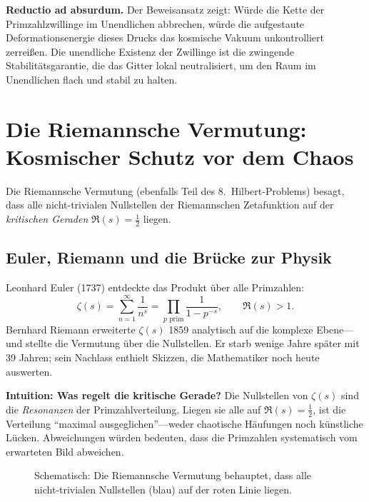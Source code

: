 \documentclass[11pt,a4paper]{article}
\begin{document}
\medskip
\noindent\textbf{Reductio ad absurdum.} Der Beweisansatz zeigt: Würde die Kette der Primzahlzwillinge im Unendlichen abbrechen, würde die aufgestaute Deformationsenergie dieses Drucks das kosmische Vakuum unkontrolliert zerreißen. Die unendliche Existenz der Zwillinge ist die zwingende Stabilitätsgarantie, die das Gitter lokal neutralisiert, um den Raum im Unendlichen flach und stabil zu halten.

\section{Die Riemannsche Vermutung: Kosmischer Schutz vor dem Chaos}

Die Riemannsche Vermutung (ebenfalls Teil des 8.\ Hilbert-Problems) besagt, dass alle nicht-trivialen Nullstellen der Riemannschen Zetafunktion auf der \emph{kritischen Geraden} $\Re(s) = \tfrac{1}{2}$ liegen.

\subsection{Euler, Riemann und die Brücke zur Physik}

Leonhard Euler (1737) entdeckte das Produkt über alle Primzahlen:
\begin{equation}
  \zeta(s) = \sum_{n=1}^{\infty} \frac{1}{n^s}
           = \prod_{p \text{ prim}} \frac{1}{1 - p^{-s}},
  \qquad \Re(s) > 1.
  \label{eq:euler-product}
\end{equation}
Bernhard Riemann erweiterte $\zeta(s)$ 1859 analytisch auf die komplexe Ebene---und stellte die Vermutung über die Nullstellen. Er starb wenige Jahre später mit 39 Jahren; sein Nachlass enthielt Skizzen, die Mathematiker noch heute auswerten.

\medskip
\noindent\textbf{Intuition: Was regelt die kritische Gerade?} Die Nullstellen von $\zeta(s)$ sind die \emph{Resonanzen} der Primzahlverteilung. Liegen sie alle auf $\Re(s)=\tfrac{1}{2}$, ist die Verteilung ``maximal ausgeglichen''---weder chaotische Häufungen noch künstliche Lücken. Abweichungen würden bedeuten, dass die Primzahlen systematisch vom erwarteten Bild abweichen.

\begin{figure}[htbp]
  \centering
  \caption{Schematisch: Die Riemannsche Vermutung behauptet, dass alle nicht-trivialen Nullstellen (blau) auf der roten Linie liegen.}
\end{figure}
\end{document}
